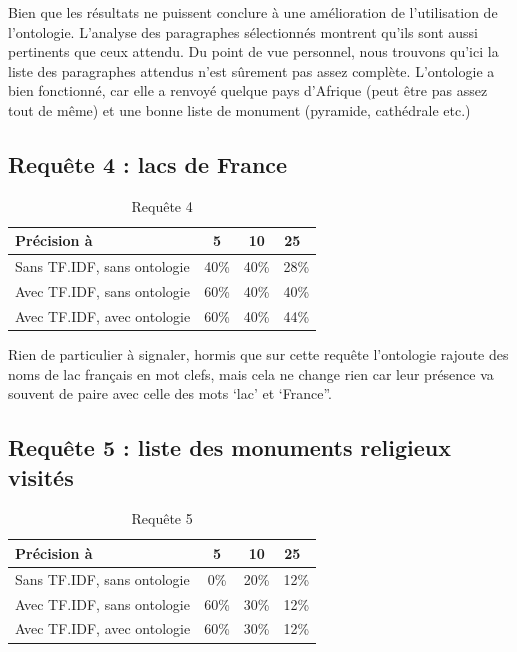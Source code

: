 \documentclass{article}
\begin{document}
Bien que les résultats ne puissent conclure à une amélioration de l’utilisation de
l’ontologie. L’analyse des paragraphes sélectionnés montrent qu’ils sont aussi
pertinents que ceux attendu.  Du point de vue personnel, nous trouvons qu’ici la
liste des paragraphes attendus n’est sûrement pas assez complète. L’ontologie a bien
fonctionné, car elle a renvoyé quelque pays d’Afrique (peut être pas assez tout de
même) et une bonne liste de monument (pyramide, cathédrale etc.)

\subsection{Requête 4 : \og lacs de France \fg }

\begin{table}[h!!]
    \centering
    \caption{Requête 4}
\begin{tabular}{|l|c|c|c|}
    \hline
    Précision à & 5 & 10 & 25 \\
    \hline
    Sans TF.IDF, sans ontologie & 40\% & 40\% & 28\% \\
    \hline
    Avec TF.IDF, sans ontologie & 60\% & 40\% & 40\% \\
    \hline
    Avec TF.IDF, avec ontologie & 60\% & 40\% & 44\% \\
    \hline
\end{tabular}
\end{table}

Rien de particulier à signaler, hormis que sur cette requête l’ontologie rajoute des
noms de lac français en mot clefs, mais cela ne change rien car leur présence va
souvent de paire avec celle des mots ‘lac’ et ‘France”.

\subsection{Requête 5 : \og liste des monuments religieux visités \fg }

\begin{table}[h!!]
    \centering
    \caption{Requête 5}
\begin{tabular}{|l|c|c|c|}
    \hline
    Précision à & 5 & 10 & 25 \\
    \hline
    Sans TF.IDF, sans ontologie & 0\% &   20\% &  12\% \\
    \hline
    Avec TF.IDF, sans ontologie & 60\% & 30\% &  12\% \\
    \hline
    Avec TF.IDF, avec ontologie & 60\% & 30\% &  12\% \\
    \hline
\end{tabular}
\end{table}
\end{document}
